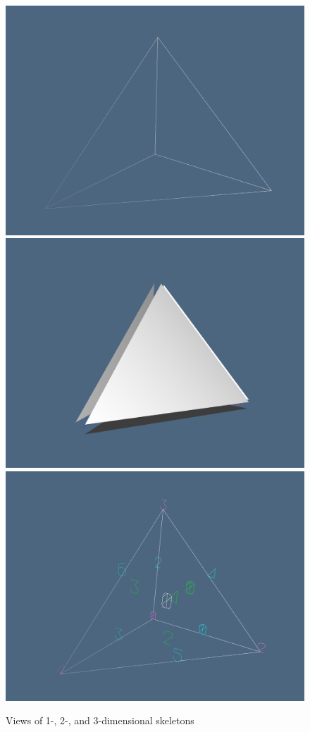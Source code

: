 \documentclass{article}
\begin{document}
\begin{figure}[h!]
\centering
\includegraphics[scale=0.4]{tetra.jpg}
\includegraphics[scale=0.4]{tetra2.jpg}
\includegraphics[scale=0.4]{numerazionetetra.jpg}
\caption{Views of  1-, 2-, and 3-dimensional skeletons}
\end{figure}
\end{document}
